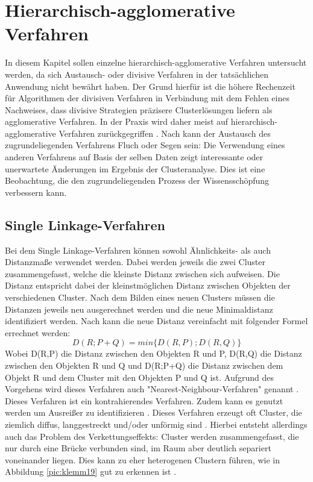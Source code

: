 \chapter{Hierarchisch-agglomerative Verfahren}

In diesem Kapitel sollen einzelne hierarchisch-agglomerative Verfahren untersucht werden, da sich Austausch- oder divisive Verfahren in der tatsächlichen Anwendung nicht bewährt haben. Der Grund hierfür ist die höhere Rechenzeit für Algorithmen der divisiven Verfahren in Verbindung mit dem Fehlen eines Nachweises, dass divisive Strategien präzisere Clusterlösungen liefern als agglomerative Verfahren. In der Praxis wird daher meist auf hierarchisch-agglomerative Verfahren zurückgegriffen \citep[Vgl.][S. ???]{Pedrycz.2010}.
Nach \citet[S.378]{Piegorsch.2015} kann der Austausch des zugrundeliegenden Verfahrens Fluch oder Segen sein: Die Verwendung eines anderen Verfahrens auf Basis der selben Daten zeigt interessante oder unerwartete Änderungen im Ergebnis der Clusteranalyse. Dies ist eine Beobachtung, die den zugrundeliegenden Prozess der Wissensschöpfung verbessern kann.

\section{Single Linkage-Verfahren}
Bei dem Single Linkage-Verfahren können sowohl Ähnlichkeits- als auch Distanzmaße verwendet werden. Dabei werden jeweils die zwei Cluster zusammengefasst, welche die kleinste Distanz zwischen sich aufweisen. Die Distanz entspricht dabei der kleinstmöglichen Distanz zwischen Objekten der verschiedenen Cluster. Nach dem Bilden eines neuen Clusters müssen die Distanzen jeweils neu ausgerechnet werden und die neue Minimaldistanz identifiziert werden.
Nach \citet{Backhaus.2016} kann die neue Distanz vereinfacht mit folgender Formel errechnet werden:
\begin{equation}
	D(R;P+Q) = min\{D(R,P);D(R,Q)\}
\end{equation}
Wobei D(R,P) die Distanz zwischen den Objekten R und P, D(R,Q) die Distanz zwischen den Objekten R und Q und D(R;P+Q) die Distanz zwischen dem Objekt R und dem Cluster mit den Objekten P und Q ist.
Aufgrund des Vorgehens wird dieses Verfahren auch "Nearest-Neighbour-Verfahren" genannt \citep[Vgl.][S.231]{Eckey.2002}.
Dieses Verfahren ist ein kontrahierendes Verfahren. Zudem kann es genutzt werden um Ausreißer zu identifizieren \citep[Vgl.][S. 481-483]{Backhaus.2016}.
Dieses Verfahren erzeugt oft Cluster, die ziemlich diffus, langgestreckt und/oder unförmig sind \citep[Vgl.][S. 377]{Piegorsch.2015}.
Hierbei entsteht allerdings auch das Problem des Verkettungseffekts: Cluster werden zusammengefasst, die nur durch eine Brücke verbunden sind, im Raum aber deutlich separiert voneinander liegen. Dies kann zu eher heterogenen Clustern führen, wie in Abbildung \ref{pic:klemm19} gut zu erkennen ist \citep[Vgl.][S. 233]{Eckey.2002}. 

